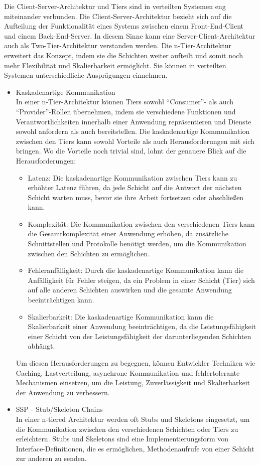 \documentclass[../vs-script-first-v01.tex]{subfiles}
\begin{document}
Die Client-Server-Architektur und Tiers sind in verteilten Systemen eng miteinander verbunden. Die Client-Server-Architektur bezieht sich auf die Aufteilung der Funktionalität eines Systems zwischen einem Front-End-Client und einem Back-End-Server. In diesem Sinne kann eine Server-Client-Architektur auch als Two-Tier-Architektur verstanden werden. Die n-Tier-Architektur erweitert das Konzept, indem sie die Schichten weiter aufteilt und somit noch mehr Flexibilität und Skalierbarkeit ermöglicht. Sie können in verteilten Systemen unterschiedliche Ausprägungen einnehmen.
\begin{itemize}

\item Kaskadenartige Kommunikation\\
In einer n-Tier-Architektur können Tiers sowohl \enquote{Consumer}- als auch \enquote{Provider}-Rollen übernehmen, indem sie verschiedene Funktionen und Verantwortlichkeiten innerhalb einer Anwendung repräsentieren und Dienste sowohl anfordern als auch bereitstellen. Die kaskadenartige Kommunikation zwischen den Tiers kann sowohl Vorteile als auch Herausforderungen mit sich bringen. Wo die Vorteile noch trivial sind, lohnt der genauere Blick auf die Herausforderungen: 
\begin{itemize}
\item Latenz: Die kaskadenartige Kommunikation zwischen Tiers kann zu erhöhter Latenz führen, da jede Schicht auf die Antwort der nächsten Schicht warten muss, bevor sie ihre Arbeit fortsetzen oder abschließen kann.
\item Komplexität: Die Kommunikation zwischen den verschiedenen Tiers kann die Gesamtkomplexität einer Anwendung erhöhen, da zusätzliche Schnittstellen und Protokolle benötigt werden, um die Kommunikation zwischen den Schichten zu ermöglichen.
\item Fehleranfälligkeit: Durch die kaskadenartige Kommunikation kann die Anfälligkeit für Fehler steigen, da ein Problem in einer Schicht (Tier) sich auf alle anderen Schichten auswirken und die gesamte Anwendung beeinträchtigen kann.
\item Skalierbarkeit: Die kaskadenartige Kommunikation kann die Skalierbarkeit einer Anwendung beeinträchtigen, da die Leistungsfähigkeit einer Schicht von der Leistungsfähigkeit der darunterliegenden Schichten abhängt.
\end{itemize}
Um diesen Herausforderungen zu begegnen, können Entwickler Techniken wie Caching, Lastverteilung, asynchrone Kommunikation und fehlertolerante Mechanismen einsetzen, um die Leistung, Zuverlässigkeit und Skalierbarkeit der Anwendung zu verbessern.
\item SSP - Stub/Skeleton Chains\\
In einer n-tiered Architektur werden oft Stubs und Skeletons eingesetzt, um die Kommunikation zwischen den verschiedenen Schichten oder Tiers zu erleichtern. Stubs und Skeletons sind eine Implementierungsform von Interface-Definitionen, die es ermöglichen, Methodenaufrufe von einer Schicht zur anderen zu senden.


\end{itemize}
\end{document}

